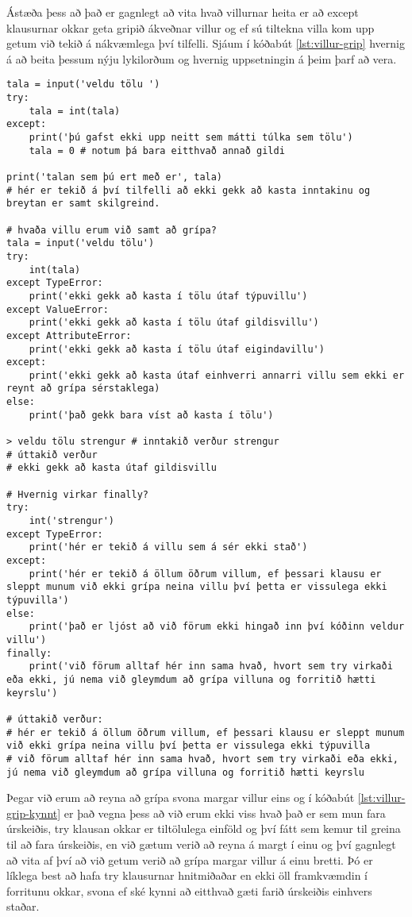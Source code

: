 Ástæða þess að það er gagnlegt að vita hvað villurnar heita er að except klausurnar okkar geta gripið ákveðnar villur og ef sú tiltekna villa kom upp getum við tekið á nákvæmlega því tilfelli.
Sjáum í kóðabút \ref{lst:villur-grip} hvernig á að beita þessum nýju lykilorðum og hvernig uppsetningin á þeim þarf að vera.

\begin{lstlisting}[caption=Hvernig á að beita try - except - else, label=lst:villur-grip-kynnt]
tala = input('veldu tölu ')
try:
	tala = int(tala)
except:
	print('þú gafst ekki upp neitt sem mátti túlka sem tölu')
	tala = 0 # notum þá bara eitthvað annað gildi
	
print('talan sem þú ert með er', tala)
# hér er tekið á því tilfelli að ekki gekk að kasta inntakinu og breytan er samt skilgreind.

# hvaða villu erum við samt að grípa?
tala = input('veldu tölu')
try:
	int(tala)
except TypeError:
	print('ekki gekk að kasta í tölu útaf týpuvillu')
except ValueError:
	print('ekki gekk að kasta í tölu útaf gildisvillu')
except AttributeError:
	print('ekki gekk að kasta í tölu útaf eigindavillu')
except:
	print('ekki gekk að kasta útaf einhverri annarri villu sem ekki er reynt að grípa sérstaklega)
else:
	print('það gekk bara víst að kasta í tölu')
	
> veldu tölu strengur # inntakið verður strengur
# úttakið verður
# ekki gekk að kasta útaf gildisvillu

# Hvernig virkar finally?
try:
	int('strengur')
except TypeError:
	print('hér er tekið á villu sem á sér ekki stað')
except:
	print('hér er tekið á öllum öðrum villum, ef þessari klausu er sleppt munum við ekki grípa neina villu því þetta er vissulega ekki týpuvilla')
else:
	print('það er ljóst að við förum ekki hingað inn því kóðinn veldur villu')
finally:
	print('við förum alltaf hér inn sama hvað, hvort sem try virkaði eða ekki, jú nema við gleymdum að grípa villuna og forritið hætti keyrslu')
	
# úttakið verður:
# hér er tekið á öllum öðrum villum, ef þessari klausu er sleppt munum við ekki grípa neina villu því þetta er vissulega ekki týpuvilla
# við förum alltaf hér inn sama hvað, hvort sem try virkaði eða ekki, jú nema við gleymdum að grípa villuna og forritið hætti keyrslu
\end{lstlisting}

Þegar við erum að reyna að grípa svona margar villur eins og í kóðabút \ref{lst:villur-grip-kynnt} er það vegna þess að við erum ekki viss hvað það er sem mun fara úrskeiðis, try klausan okkar er tiltölulega einföld og því fátt sem kemur til greina til að fara úrskeiðis, en við gætum verið að reyna á margt í einu og því gagnlegt að vita af því að við getum verið að grípa margar villur á einu bretti.
Þó er líklega best að hafa try klausurnar hnitmiðaðar en ekki öll framkvæmdin í forritunu okkar, svona ef ské kynni að eitthvað gæti farið úrskeiðis einhvers staðar.

